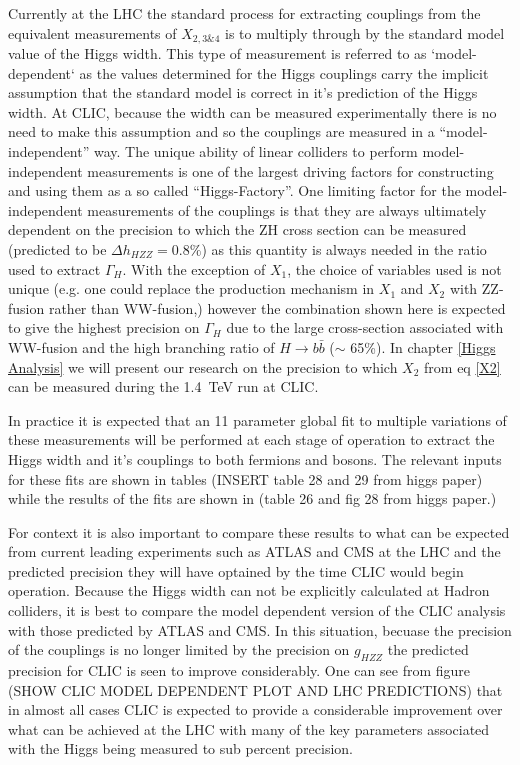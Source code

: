 Currently at the LHC the standard process for extracting couplings from the equivalent measurements of $X_{2,3\&4}$ is to multiply through by the standard model value of the Higgs width. This type of measurement is referred to as `model-dependent` as the values determined for the Higgs couplings carry the implicit assumption that the standard model is correct in it's prediction of the Higgs width. At CLIC, because the width can be measured experimentally there is no need to make this assumption and so the couplings are measured in a ``model-independent'' way. The unique ability of linear colliders to perform model-independent measurements is one of the largest driving factors for constructing and using them as a so called ``Higgs-Factory''. One limiting factor for the model-independent measurements of the couplings is that they are always ultimately dependent on the precision to which the ZH cross section can be measured (predicted to be $\Delta h_{HZZ} = 0.8\%$) as this quantity is always needed in the ratio used to extract $\Gamma_H$. With the exception of $X_1$, the choice of variables used is not unique (e.g. one could replace the production mechanism in $X_1$ and $X_2$ with ZZ-fusion rather than WW-fusion,) however the combination shown here is expected to give the highest precision on $\Gamma_H$ due to the large cross-section associated with WW-fusion and the high branching ratio of $H\rightarrow b\bar{b}$ ($\sim$ 65\%). In chapter \ref{Higgs Analysis} we will present our research on the precision to which $X_2$ from eq \ref{X2} can be measured during the 1.4~TeV run at CLIC.

In practice it is expected that an 11 parameter global fit to multiple variations of these measurements will be performed at each stage of operation to extract the Higgs width and it's couplings to both fermions and bosons. The relevant inputs for these fits are shown in tables (INSERT table 28 and 29 from higgs paper) while the results of the fits are shown in (table 26 and fig 28 from higgs paper.)

For context it is also important to compare these results to what can be expected from current leading experiments such as ATLAS and CMS at the LHC and the predicted precision they will have optained by the time CLIC would begin operation. Because the Higgs width can not be explicitly calculated at Hadron colliders, it is best to compare the model dependent version of the CLIC analysis with those predicted by ATLAS and CMS. In this situation, becuase the precision of the couplings is no longer limited by the precision on $g_{HZZ}$ the predicted precision for CLIC is seen to improve considerably. One can see from figure (SHOW CLIC MODEL DEPENDENT PLOT AND LHC PREDICTIONS) that in almost all cases CLIC is expected to provide a considerable improvement over what can be achieved at the LHC with many of the key parameters associated with the Higgs being measured to sub percent precision.

